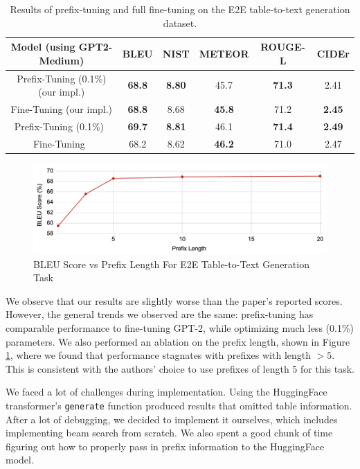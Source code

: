 \documentclass[11pt]{article} %
\begin{document}
\begin{table}[H]
    \centering
    \begin{tabular}{c|ccccc}
        \textbf{Model (using GPT2-Medium)} & \textbf{BLEU} & \textbf{NIST} & \textbf{METEOR} & \textbf{ROUGE-L} & \textbf{CIDEr} \\
        \hline
        Prefix-Tuning (0.1\%) (our impl.) & \textbf{68.8} & \textbf{8.80} & 45.7 & \textbf{71.3} & 2.41 \\
        Fine-Tuning (our impl.) & \textbf{68.8} & 8.68 & \textbf{45.8} & 71.2 & \textbf{2.45}\\
        \hline
        Prefix-Tuning (0.1\%)~\cite{li-liang-2021-prefix}  & \textbf{69.7} & \textbf{8.81} & 46.1 & \textbf{71.4} & \textbf{2.49} \\
        Fine-Tuning~\cite{li-liang-2021-prefix} & 68.2 & 8.62 & \textbf{46.2} & 71.0 & 2.47
    \end{tabular}
    \caption{Results of prefix-tuning and full fine-tuning on the E2E table-to-text generation dataset.}
    \label{tab:results}
\end{table}

\begin{figure}
    \centering
    \includegraphics[width=0.75\linewidth]{image.png}
    \caption{BLEU Score vs Prefix Length For E2E Table-to-Text Generation Task}
    \label{pref_len}
\end{figure}

We observe that our results are slightly worse than the paper's reported scores. However, the general trends we observed are the same: prefix-tuning has comparable performance to fine-tuning GPT-2, while optimizing much less (0.1\%) parameters. We also performed an ablation on the prefix length, shown in Figure \ref{pref_len}, where we found that performance stagnates with prefixes with length $>5$. This is consistent with the authors' choice to use prefixes of length 5 for this task.

We faced a lot of challenges during implementation. Using the HuggingFace transformer's \texttt{generate} function produced results that omitted table information. After a lot of debugging, we decided to implement it ourselves, which includes implementing beam search from scratch. We also spent a good chunk of time figuring out how to properly pass in prefix information to the HuggingFace model.
\end{document}
